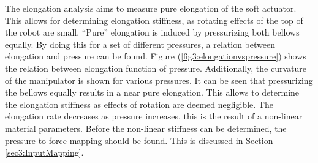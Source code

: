 The elongation analysis aims to measure pure elongation of the soft actuator. This allows for determining elongation stiffness, as rotating effects of the top of the robot are small. ``Pure'' elongation is induced by pressurizing both bellows equally. By doing this for a set of different pressures, a relation between elongation and pressure can be found. Figure (\ref{fig3:elongationvspressure}) shows the relation between elongation function of pressure. Additionally, the curvature of the manipulator is shown for various pressures. It can be seen that pressurizing the bellows equally results in a near pure elongation. This allows to determine the elongation stiffness as effects of rotation are deemed negligible. The elongation rate decreases as pressure increases, this is the result of a non-linear material parameters. Before the non-linear stiffness can be determined, the pressure to force mapping should be found. This is discussed in Section \ref{sec3:InputMapping}.

